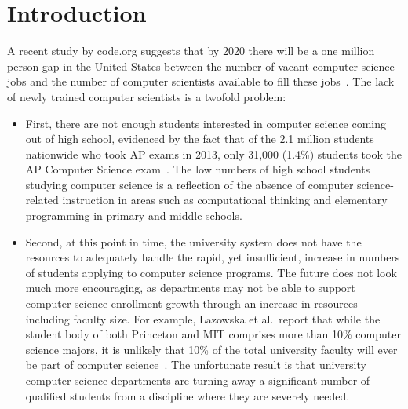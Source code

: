 \chapter{Introduction} \label{chap:introduction}
A recent study by code.org suggests that by 2020 there will be a one million
person gap in the United States between the number of vacant computer science
jobs and the number of computer scientists available to fill these
jobs~\cite{codeorg:2013}. The lack of newly trained computer scientists is a
twofold problem:

\begin{itemize}
\item First, there are not enough students interested in computer science
  coming out of high school, evidenced by the fact that of the 2.1 million
  students nationwide who took AP exams in 2013, only 31,000 (1.4\%) students
  took the AP Computer Science exam~\cite{cb:2013}. The low numbers of high
  school students studying computer science is a reflection of the absence of
  computer science-related instruction in areas such as computational thinking
  and elementary programming in primary and middle schools.
\item Second, at this point in time, the university system does not have the
  resources to adequately handle the rapid, yet insufficient, increase in
  numbers of students applying to computer science programs. The future does
  not look much more encouraging, as departments may not be able to support
  computer science enrollment growth through an increase in resources including
  faculty size. For example, Lazowska et al.\ report that while the student
  body of both Princeton and MIT comprises more than 10\% computer science
  majors, it is unlikely that 10\% of the total university faculty will ever be
  part of computer science~\cite{lazowska:2014}. The unfortunate result is that
  university computer science departments are turning away a significant number
  of qualified students from a discipline where they are severely needed.
\end{itemize}

